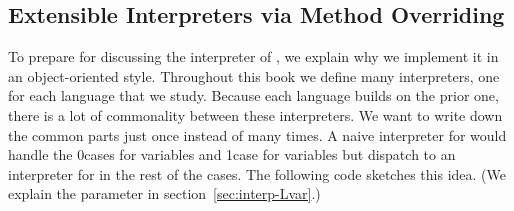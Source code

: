\documentclass[7x10]{TimesAPriori_MIT}%
\def\racketEd{0}
\def\pythonEd{1}
\def\edition{0}
\newcommand{\racket}[1]{{\if\edition\racketEd{#1}\fi}}
\newcommand{\python}[1]{{\if\edition\pythonEd #1\fi}}
\numberwithin{theorem}{chapter}
\numberwithin{definition}{chapter}
\numberwithin{equation}{chapter}
\begin{document}
\subsection{Extensible Interpreters via Method Overriding}
\label{sec:extensible-interp}

To prepare for discussing the interpreter of \LangVar{}, we explain
why we implement it in an object-oriented style. Throughout this book
we define many interpreters, one for each language that we
study. Because each language builds on the prior one, there is a lot
of commonality between these interpreters. We want to write down the
common parts just once instead of many times. A naive interpreter for
\LangVar{} would handle the \racket{cases for variables and
  } \python{case for variables} but dispatch to an
interpreter for \LangInt{} in the rest of the cases. The following
code sketches this idea. (We explain the  parameter in
section~\ref{sec:interp-Lvar}.)
\end{document}
